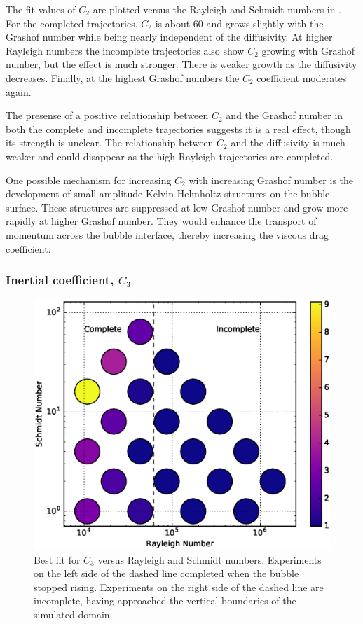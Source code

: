 The fit values of $C_2$ are plotted versus the Rayleigh and Schmidt numbers in .
For the completed trajectories, $C_2$ is about $60$ and grows slightly with the Grashof number while being nearly independent of the diffusivity.
At higher Rayleigh numbers the incomplete trajectories also show $C_2$ growing with Grashof number, but the effect is much stronger.
There is weaker growth as the diffusivity decreases.
Finally, at the highest Grashof numbers the $C_2$ coefficient moderates again.

The presense of a positive relationship between $C_2$ and the Grashof number in both the complete and incomplete trajectories suggests it is a real effect, though its strength is unclear.
The relationship between $C_2$ and the diffusivity is much weaker and could disappear as the high Rayleigh trajectories are completed.

One possible mechanism for increasing $C_2$ with increasing Grashof number is the development of small amplitude Kelvin-Helmholtz structures on the bubble surface.
These structures are suppressed at low Grashof number and grow more rapidly at higher Grashof number.
They would enhance the transport of momentum across the bubble interface, thereby increasing the viscous drag coefficient.

\subsubsection{Inertial coefficient, $C_3$}
\begin{figure}
\includegraphics[width=\columnwidth]{figs/C3-vs-Rayleigh-Schmidt}
\caption{ 
  Best fit for $C_3$ versus Rayleigh and Schmidt numbers.
  Experiments on the left side of the dashed line completed when the bubble stopped rising.
  Experiments on the right side of the dashed line are incomplete, having approached the vertical boundaries of the simulated domain.
}
\end{figure}

